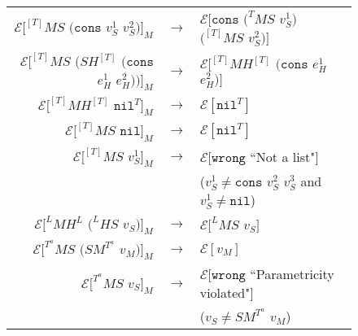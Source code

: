 \begin{figure}[p]
\begin{center}
\begin{tabular}{rcl}
$\mathscr{E}[^{[T]}MS$ $(\mathtt{cons}$ $v_{S}^{1}$ $v_{S}^{2})]_{M}$ & $\rightarrow$ & $\mathscr{E}[\mathtt{cons}$ $(^{T}MS$ $v_{S}^{1})$ $(^{[T]}MS$ $v_{S}^{2})]$ \\
$\mathscr{E}[^{[T]}MS$ $(SH^{[T]}$ $(\mathtt{cons}$ $e_{H}^{1}$ $e_{H}^{2}))]_{M}$ & $\rightarrow$ & $\mathscr{E}[^{[T]}MH^{[T]}$ $(\mathtt{cons}$ $e_{H}^{1}$ $e_{H}^{2})]$ \\
$\mathscr{E}[^{[T]}MH^{[T]}$ $\mathtt{nil}^{T}]_{M}$ & $\rightarrow$ & $\mathscr{E}[\mathtt{nil}^{T}]$ \\
$\mathscr{E}[^{[T]}MS$ $\mathtt{nil}]_{M}$ & $\rightarrow$ & $\mathscr{E}[\mathtt{nil}^{T}]$ \\
$\mathscr{E}[^{[T]}MS$ $v_{S}^{1}]_{M}$ & $\rightarrow$ & $\mathscr{E}[\mathtt{wrong}$ ``Not a list"$]$ \\
&& ($v_{S}^{1}\neq\mathtt{cons}$ $v_{S}^{2}$ $v_{S}^{3}$ and $v_{S}^{1}\neq\mathtt{nil}$) \\
$\mathscr{E}[^{L}MH^{L}$ $(^{L}HS$ $v_{S})]_{M}$ & $\rightarrow$ & $\mathscr{E}[^{L}MS$ $v_{S}]$ \\
$\mathscr{E}[^{T^{a}}MS$ $(SM^{T^{a}}$ $v_{M})]_{M}$ & $\rightarrow$ & $\mathscr{E}[v_{M}]$ \\
$\mathscr{E}[^{T^{a}}MS$ $v_{S}]_{M}$ & $\rightarrow$ & $\mathscr{E}[\mathtt{wrong}$ ``Parametricity violated"$]$ \\
&& ($v_{S}\neq SM^{T^{a}}$ $v_{M}$)
\end{tabular}
\end{center}
\end{figure}